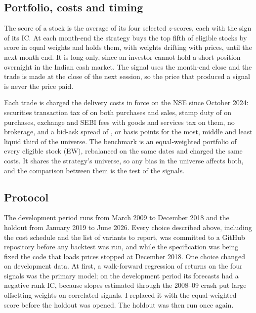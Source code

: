 \documentclass[11pt]{article}
\begin{document}
\subsection{Portfolio, costs and timing}

The score of a stock is the average of its four selected $z$-scores, each with the
sign of its IC. At each month-end the strategy buys the top fifth of eligible stocks
by score in equal weights and holds them, with weights drifting with prices, until
the next month-end. It is long only, since an investor cannot hold a short
position overnight in the Indian cash market. The signal uses the month-end close
and the trade is made at the close of the next session, so the price that produced a
signal is never the price paid.

Each trade is charged the delivery costs in force on the NSE since October 2024:
securities transaction tax of \CostSTT{} on both purchases and sales, stamp duty of
\CostStamp{} on purchases, exchange and SEBI fees with goods and services tax on
them, no brokerage, and a bid-ask spread of \SpreadLow, \SpreadMid{} or
\SpreadHigh{} basis points for the most, middle and least liquid third of the
universe. The benchmark is an equal-weighted portfolio of every eligible stock (EW),
rebalanced on the same dates and charged the same costs. It shares the strategy's
universe, so any bias in the universe affects both, and the comparison between them
is the test of the signals.

\subsection{Protocol}

The development period runs from March 2009 to December 2018 and the holdout from
January 2019 to June 2026. Every choice described above, including the cost
schedule and the list of variants to report, was committed to a GitHub repository before
any backtest was run, and while the specification was being fixed the code that
loads prices stopped at December 2018. One choice changed on development data. At first,
a walk-forward \citet{fama1973} regression of returns on
the four signals was the primary model; on the development period its forecasts had a
negative rank IC, because slopes estimated through the 2008--09 crash put large
offsetting weights on correlated signals. I replaced it with the equal-weighted
score before the holdout was opened. The
holdout was then run once again.
\end{document}
